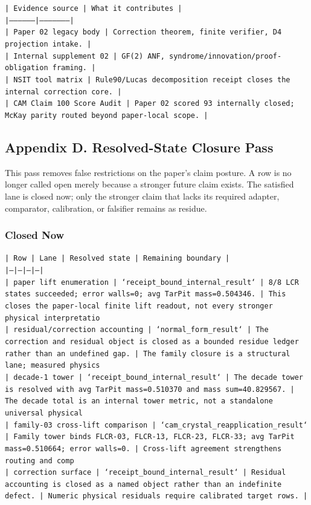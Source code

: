 \documentclass[11pt]{article}
\begin{document}
\noindent\texttt{| Evidence source | What it contributes |}\\
\noindent\texttt{|-----------------|---------------------|}\\
\noindent\texttt{| Paper 02 legacy body | Correction theorem, finite verifier, D4 projection intake. |}\\
\noindent\texttt{| Internal supplement 02 | GF(2) ANF, syndrome/innovation/proof-obligation framing. |}\\
\noindent\texttt{| NSIT tool matrix | Rule90/Lucas decomposition receipt closes the internal correction core. |}\\
\noindent\texttt{| CAM Claim 100 Score Audit | Paper 02 scored 93 internally closed; McKay parity routed beyond paper-local scope. |}\\

\subsection*{Appendix D. Resolved-State Closure Pass}

This pass removes false restrictions on the paper's claim posture. A row is no longer called open merely because a stronger future claim exists. The satisfied lane is closed now; only the stronger claim that lacks its required adapter, comparator, calibration, or falsifier remains as residue.

\subsubsection*{Closed Now}

\noindent\texttt{| Row | Lane | Resolved state | Remaining boundary |}\\
\noindent\texttt{|---|---|---|---|}\\
\noindent\texttt{| paper lift enumeration | `receipt\_bound\_internal\_result` | 8/8 LCR states succeeded; error walls=0; avg TarPit mass=0.504346. | This closes the paper-local finite lift readout, not every stronger physical interpretatio}\\
\noindent\texttt{| residual/correction accounting | `normal\_form\_result` | The correction and residual object is closed as a bounded residue ledger rather than an undefined gap. | The family closure is a structural lane; measured physics}\\
\noindent\texttt{| decade-1 tower | `receipt\_bound\_internal\_result` | The decade tower is resolved with avg TarPit mass=0.510370 and mass sum=40.829567. | The decade total is an internal tower metric, not a standalone universal physical }\\
\noindent\texttt{| family-03 cross-lift comparison | `cam\_crystal\_reapplication\_result` | Family tower binds FLCR-03, FLCR-13, FLCR-23, FLCR-33; avg TarPit mass=0.510664; error walls=0. | Cross-lift agreement strengthens routing and comp}\\
\noindent\texttt{| correction surface | `receipt\_bound\_internal\_result` | Residual accounting is closed as a named object rather than an indefinite defect. | Numeric physical residuals require calibrated target rows. |}\\
\end{document}
